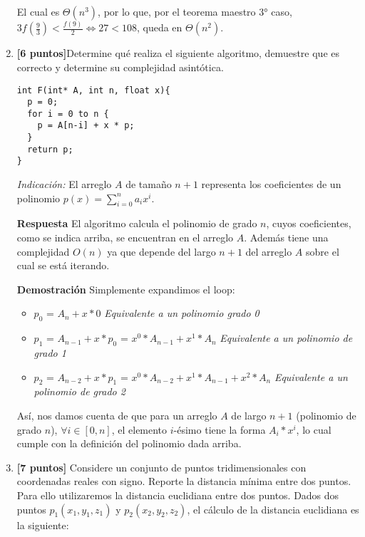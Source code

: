 \documentclass[10pt]{article}
\begin{document}
\begin{enumerate}
El cual es $\Theta(n^3)$, por lo que, por el teorema maestro 3° caso, $3f(\frac{9}{3})<\frac{f(9)}{2} \Leftrightarrow 27 < 108$, queda en $\Theta(n^2)$.

\item \textbf{[6 puntos]}Determine qué realiza el siguiente algoritmo, demuestre que es correcto y determine su complejidad asintótica.

\begin{scriptsize}
\begin{verbatim}
int F(int* A, int n, float x){
  p = 0;
  for i = 0 to n {
    p = A[n-i] + x * p;
  }
  return p;
}
\end{verbatim}
\end{scriptsize}

\textit{Indicación:} El arreglo $A$ de tamaño $n+1$ representa los coeficientes de un polinomio $p(x)=\sum_{i=0}^na_ix^i$.

\textbf{Respuesta} El algoritmo calcula el polinomio de grado $n$, cuyos coeficientes, como se indica arriba, se encuentran en el arreglo $A$. Además tiene una complejidad $O(n)$ ya que depende del largo $n+1$ del arreglo $A$ sobre el cual se está iterando.

\textbf{Demostración} Simplemente expandimos el loop:

\begin{itemize}
	\item $p_0$ = $A_n + x * 0$ \textit{Equivalente a un polinomio grado 0}
	\item $p_1$ = $A_{n-1} + x * p_0$ = $x^0 * A_{n-1} + x^1 * A_n$ \textit{Equivalente a un polinomio de grado 1}
	\item $p_2$ = $A_{n-2} + x * p_1$ = $x^0 * A_{n-2} + x^1 * A_{n-1} + x^2 * A_n$ \textit{Equivalente a un polinomio de grado 2}
\end{itemize}

Así, nos damos cuenta de que para un arreglo $A$ de largo $n+1$ (polinomio de grado $n$), $\forall{} i \in [0, n]$, el elemento $i$-ésimo tiene la forma $A_{i}*x^i$, lo cual cumple con la definición del polinomio dada arriba.

\item \textbf{[7 puntos]} Considere un conjunto de puntos tridimensionales con coordenadas reales con signo. Reporte la distancia mínima entre dos puntos. Para ello utilizaremos la distancia euclidiana entre dos puntos. Dados dos puntos $p_1(x_1,y_1,z_1)$ y $p_2(x_2,y_2,z_2)$, el cálculo de la distancia euclidiana es la siguiente:


\end{enumerate}
\end{document}
